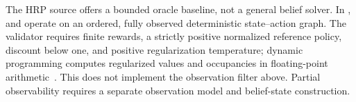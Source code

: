The HRP source offers a bounded oracle baseline, not a general belief solver. In ,  and  operate on an ordered, fully observed deterministic state--action graph. The validator requires finite rewards, a strictly positive normalized reference policy, discount below one, and positive regularization temperature; dynamic programming computes regularized values and occupancies in floating-point arithmetic~\cite{ch01_hrp_code2026}. This does not implement the observation filter above. Partial observability requires a separate observation model and belief-state construction.
